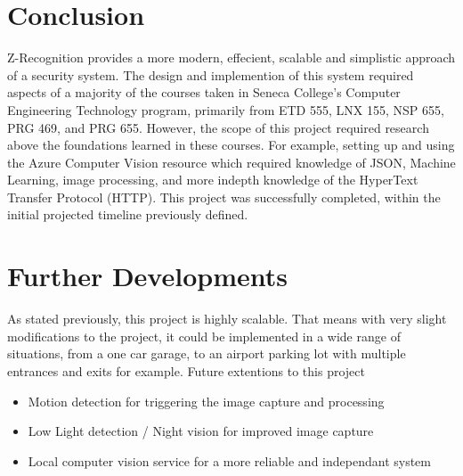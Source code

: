 \documentclass[12pt]{article}
\begin{document}
\newpage
\section{Conclusion}
Z-Recognition provides a more modern, effecient, scalable and simplistic approach of a security system. The design and implemention of this system required aspects of a majority of the courses taken in Seneca College's Computer Engineering Technology program, primarily from ETD 555, LNX 155, NSP 655, PRG 469, and PRG 655. However, the scope of this project required research above the foundations learned in these courses. For example, setting up and using the Azure Computer Vision resource which required knowledge of JSON, Machine Learning, image processing, and more indepth knowledge of the HyperText Transfer Protocol (HTTP). This project was successfully completed, within the initial projected timeline previously defined.
\vspace{2cm}

\section{Further Developments}
As stated previously, this project is highly scalable. That means with very slight modifications to the project, it could be implemented in a wide range of situations, from a one car garage, to an airport parking lot with multiple entrances and exits for example. Future extentions to this project
\begin{itemize}
    \item Motion detection for triggering the image capture and processing
    \item Low Light detection / Night vision for improved image capture
    \item Local computer vision service for a more reliable and independant system
\end{itemize}


\appendix

\newpage
\end{document}
